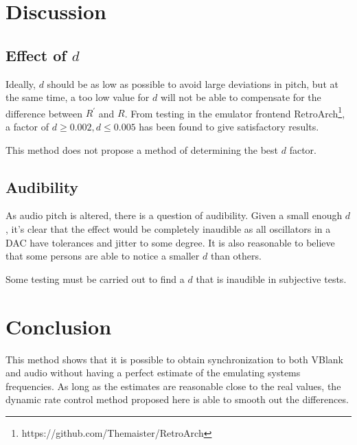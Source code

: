 \documentclass[11pt, a4paper]{article}
\begin{document}
\section{Discussion}

\subsection{Effect of $d$}
Ideally, $d$ should be as low as possible to avoid large deviations in pitch, but at the same time, a too low value for $d$ will not be able to compensate for the difference between $R^{'}$ and $R$.
From testing in the emulator frontend RetroArch\footnote{https://github.com/Themaister/RetroArch}, a factor of $d \geq 0.002, d \leq 0.005$ has been found to give satisfactory results.

This method does not propose a method of determining the best $d$ factor.

\subsection{Audibility}
As audio pitch is altered, there is a question of audibility. Given a small enough $d$, it's
clear that the effect would be completely inaudible as all oscillators in a DAC have tolerances and jitter to some degree. It is also reasonable to believe that some persons are able to notice a smaller $d$ than others.

Some testing must be carried out to find a $d$ that is inaudible in subjective tests.

\section{Conclusion}
This method shows that it is possible to obtain synchronization to both VBlank and audio without having a perfect estimate of the emulating systems frequencies. As long as the estimates are reasonable close to the real values, the dynamic rate control method proposed here is able to smooth out the differences.
\end{document}

